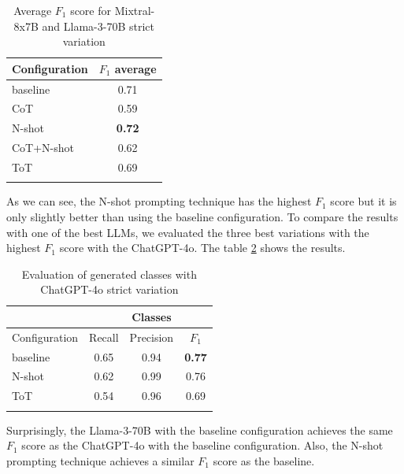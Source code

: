 \begin{table}[!h]
    \scriptsize
    \centering
    \setlength{\tabcolsep}{0.5em}
    \begin{tabular}{lc}
    \toprule
        Configuration & $F_1$ average \\
    \toprule
    
    \addlinespace
         baseline   & 0.71 \\
         CoT        & 0.59 \\
         N-shot     & \textbf{0.72} \\
         CoT+N-shot & 0.62 \\
         ToT        & 0.69 \\
    \addlinespace
    \bottomrule
    \addlinespace
    \end{tabular}
    \caption{Average $F_1$ score for Mixtral-8x7B and Llama-3-70B strict variation}
    \label{tab:average-classes}
\end{table}

As we can see, the N-shot prompting technique has the highest $F_1$ score but it is only slightly better than using the baseline configuration. To compare the results with one of the best LLMs, we evaluated the three best variations with the highest $F_1$ score with the ChatGPT-4o. The table \ref{tab:chatgpt-classes} shows the results.


\begin{table}[!h]
    \scriptsize
    \centering
    \setlength{\tabcolsep}{0.5em}
    \begin{tabular}{lccc}
    \toprule
    & & Classes & \\
    \toprule
       Configuration & Recall & Precision & $F_1$ \\
    \toprule
    
    \addlinespace
         baseline    & 0.65 & 0.94 & \textbf{0.77} \\
         N-shot      & 0.62 & 0.99 & 0.76 \\
         ToT         & 0.54 & 0.96 & 0.69 \\
    \addlinespace
    \bottomrule
    \addlinespace
    \end{tabular}
    \caption{Evaluation of generated classes with ChatGPT-4o strict variation}
    \label{tab:chatgpt-classes}
\end{table}

Surprisingly, the Llama-3-70B with the baseline configuration achieves the same $F_1$ score as the ChatGPT-4o with the baseline configuration. Also, the N-shot prompting technique achieves a similar $F_1$ score as the baseline.


